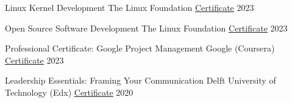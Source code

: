 

\begin{cvhonors}

  \cvhonor
    {Linux Kernel Development} %
    {The Linux Foundation} %
    {\underline{\href{https://ti-user-certificates.s3.amazonaws.com/e0df7fbf-a057-42af-8a1f-590912be5460/7834d4ac-6949-4105-b959-c851d41f5324-muhammad-furqan-cc050c0e-3f78-4faa-b9ad-092122c5d5c9-certificate.pdf}{\faExternalLink* Certificate}}} %
    {2023} %

  \cvhonor
    {Open Source Software Development} %
    {The Linux Foundation} %
    {\underline{\href{https://ti-user-certificates.s3.amazonaws.com/e0df7fbf-a057-42af-8a1f-590912be5460/7834d4ac-6949-4105-b959-c851d41f5324-muhammad-furqan-75314b9f-5987-4a57-8a58-4935940ed5f7-certificate.pdf}{\faExternalLink* Certificate}}} %
    {2023} %

  \cvhonor
    {Professional Certificate: Google Project Management} %
    {Google (Coursera)} %
    {\underline{\href{https://www.coursera.org/account/accomplishments/professional-cert/4Z4V7RJ4XDGQ}{\faExternalLink* Certificate}}} %
    {2023} %

  \cvhonor
    {Leadership Essentials: Framing Your Communication} %
    {Delft University of Technology (Edx)} %
    {\underline{\href{https://courses.edx.org/certificates/0ff36d334bb7485f8ed83c538d352e94}{\faExternalLink* Certificate}}} %
    {2020} %

\end{cvhonors}
